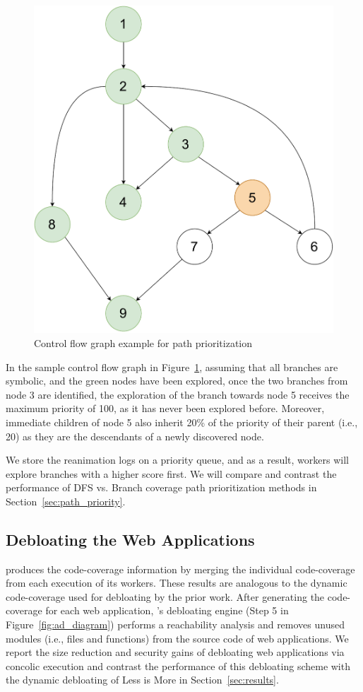\begin{figure}[t]
    \centering
    \includegraphics[width=0.4\columnwidth]{figures/ad/AD_Path_Prio_CFG.pdf}
    \caption{Control flow graph example for path prioritization}
    \label{fig:cfg_pathprioritization}
\end{figure}

In the sample control flow graph in Figure~\ref{fig:cfg_pathprioritization}, assuming that all branches are symbolic, and the green nodes have been explored, once the two branches from node 3 are identified, the exploration of the branch towards node 5 receives the maximum priority of 100, as it has never been explored before. 
Moreover, immediate children of node 5 also inherit 20\% of the priority of their parent (i.e., 20) as they are the descendants of a newly discovered node. 

We store the reanimation logs on a priority queue, and as a result, workers will explore branches with a higher score first. 
We will compare and contrast the performance of DFS vs. Branch coverage path prioritization methods in Section~\ref{sec:path_priority}. 

\subsection{Debloating the Web Applications}
\animatedead{} produces the code-coverage information by merging the individual code-coverage from each execution of its workers. 
These results are analogous to the dynamic code-coverage used for debloating by the prior work. 
After generating the code-coverage for each web application, \animatedead{}'s debloating engine (Step 5 in Figure~\ref{fig:ad_diagram}) performs a reachability analysis and removes unused modules (i.e., files and functions) from the source code of web applications. 
We report the size reduction and security gains of debloating web applications via concolic execution and contrast the performance of this debloating scheme with the dynamic debloating of Less is More in Section~\ref{sec:results}. 


